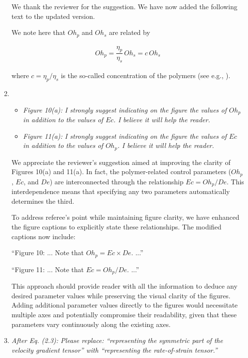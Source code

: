 \documentclass[]{article}
\newcommand{\oo}{\color{magenta} \normalfont}
\newcommand{\bb}{\color{black} \normalfont}
\begin{document}
\begin{enumerate}
We thank the reviewer for the suggestion. We have now added the following text to the updated version.

\oo We note here that $Oh_p$ and $Oh_s$ are related by

\begin{align}
	Oh_p = \dfrac{\eta_p}{\eta_s} \, Oh_s = c\,Oh_s
\end{align}

\noindent where $c = \eta_p/\eta_s$ is the so-called concentration of the polymers (see e.g., \citet{remmelgas1999computational, hinch2024fast}). \bb

\item \begin{itemize}
	\item \textit{Figure 10(a): I strongly suggest indicating on the figure the values of $Oh_p$ in addition to the values of $Ec$. I believe it will help the reader.}
	\item \textit{Figure 11(a): I strongly suggest indicating on the figure the values of $Ec$ in addition to the values of $Oh_p$. I believe it will help the reader.}
\end{itemize}

We appreciate the reviewer's suggestion aimed at improving the clarity of Figures 10(a) and 11(a). In fact, the polymer-related control parameters ($Oh_p$, $Ec$, and $De$) are interconnected through the relationship $Ec = Oh_p/De$. This interdependence means that specifying any two parameters automatically determines the third.

To address referee's point while maintaining figure clarity, we have enhanced the figure captions to explicitly state these relationships. The modified captions now include:


``Figure 10: ... {\oo Note that $Oh_p = Ec\times De$. \bb} ...''

``Figure 11: ... {\oo Note that $Ec = Oh_p/De$. \bb} ...''

This approach should provide reader with all the information to deduce any desired parameter values while preserving the visual clarity of the figures. Adding additional parameter values directly to the figures would necessitate multiple axes and potentially compromise their readability, given that these parameters vary continuously along the existing axes.


\item \textit{After Eq. (2.3): Please replace: “representing the symmetric part of the velocity
gradient tensor” with “representing the rate-of-strain tensor.”}


\end{enumerate}
\end{document}
